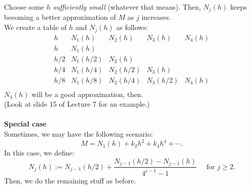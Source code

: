 \documentclass{article}
\begin{document}
\begin{enumerate}
	Choose some $h$ \emph{sufficiently small} (whatever that means). Then, $N_j(h)$ keeps becoming a better approximation of $M$ as $j$ increases.\\
	We create a table of $h$ and $N_j(h)$ as follows:\\
		\[
		\begin{array}{c|c|c|c|c}
			h & N_1(h) & N_2(h) & N_3(h) & N_4(h)\\
			\hline
			h & N_1(h) & & &\\
			h/2 & N_1(h/2) & N_2(h) & & \\
			h/4 & N_1(h/4) & N_2(h/2) & N_3(h) & \\
			h/8 & N_1(h/8) & N_2(h/4) & N_3(h/2) & N_4(h) \\
		\end{array}
		\]
	$N_4(h)$ will be a good approximation, then.\\
	(Look at slide 15 of Lecture 7 for an example.)\\~\\
	\textbf{Special case}\\
	Sometimes, we may have the following scenario:
	\[M = N_1(h) + k_2h^2 + k_4h^4 + \cdots.\]
	In this case, we define:
	\[N_j(h) := N_{j-1}(h/2) + \frac{N_{j-1}(h/2) - N_{j-1}(h)}{4^{j-1} - 1} \quad \text{ for } j \ge 2.\]
	Then, we do the remaining stuff as before.
\end{enumerate}
\end{document}
